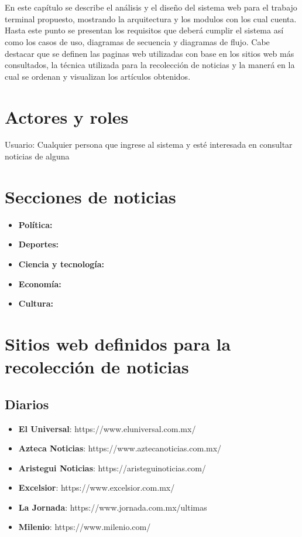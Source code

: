 \ \\\\
En este capítulo se describe el análisis y el diseño del sistema web para el trabajo terminal propuesto, mostrando la 
arquitectura y los modulos con los cual cuenta. Hasta este punto se presentan los requisitos que
deberá cumplir el sistema así como los casos de uso, diagramas de secuencia y diagramas de flujo. Cabe destacar que se 
definen las paginas web utilizadas con base en los sitios web más consultados\cite{}, la técnica utilizada para la recolección de noticias
y la manerá en la cual se ordenan y visualizan los artículos obtenidos.
\\


\section{Actores y roles}
Usuario: Cualquier persona que ingrese al sistema y esté interesada en consultar noticias de alguna 

\section{Secciones de noticias}
\begin{itemize}
  \item \textbf{Política: }
  \item \textbf{Deportes: }
  \item \textbf{Ciencia y tecnología: }
  \item \textbf{Economía: }
  \item \textbf{Cultura: }
\end{itemize}

\section{Sitios web definidos para la recolección de noticias}
\subsection{Diarios}
\begin{itemize}
  \item \textbf{El Universal}: https://www.eluniversal.com.mx/
  \item \textbf{Azteca Noticias}: https://www.aztecanoticias.com.mx/
  \item \textbf{Aristegui Noticias}: https://aristeguinoticias.com/
  \item \textbf{Excelsior}: https://www.excelsior.com.mx/
  \item \textbf{La Jornada}: https://www.jornada.com.mx/ultimas
  \item \textbf{Milenio}: https://www.milenio.com/
\end{itemize}

